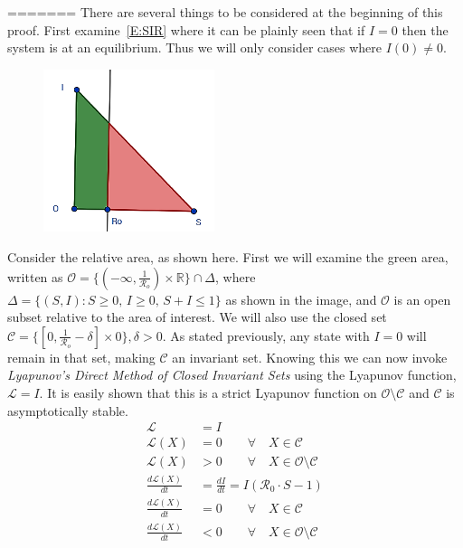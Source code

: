 \documentclass[12pt]{article}
\begin{document}
\begin{enumerate}[(a)]
=======
There are several things to be considered at the beginning of this proof. First examine~\eqref{E:SIR} where it can be plainly seen that if $I=0$ then the system is at an equilibrium. Thus we will only consider cases where $I(0)\neq 0$.
\begin{center}
\begin{figure}[h]
\includegraphics[width=5cm]{images/4MB3_A1_2c.png}
\end{figure}
\end{center}
Consider the relative area, as shown here. First we will examine the green area, written as ${\mathcal O}=\{(-\infty,\frac{1}{{\mathcal R}_o}) \times \mathbb{R}\}\cap \Delta$, where $\Delta=\{(S,I):S\ge0,\, I\ge0,\, S+I\le1\}$ as shown in the image, and ${\mathcal O}$ is an open subset relative to the area of interest. We will also use the closed set ${\mathcal C}=\{[0,\frac{1}{{\mathcal R}_o}-\delta]\times{0}\}, \delta > 0$. As stated previously, any state with $I=0$ will remain in that set, making $\mathcal C$ an invariant set. Knowing this we can now invoke \textit{Lyapunov's Direct Method of Closed Invariant Sets} using the Lyapunov function, $\mathcal{L} = I$. It is easily shown that this is a strict Lyapunov function on $\mathcal{O} \setminus \mathcal{C}$ and $\mathcal{C}$ is asymptotically stable.
\begin{equation}
{\displaystyle {\begin{aligned}
\mathcal{L}&=I \\
\mathcal{L}(X)&=0 \qquad \forall \quad X \in \mathcal{C} \\
\mathcal{L}(X) &> 0 \qquad \forall \quad X \in \mathcal{O} \setminus \mathcal{C} \\
\frac{d\mathcal{L}(X)}{dt} &= \frac{dI}{dt}=I(\mathcal{R}_0 \cdot S-1) \\
\frac{d\mathcal{L}(X)}{dt} &= 0 \qquad \forall \quad X \in \mathcal{C} \\
\frac{d\mathcal{L}(X)}{dt} &< 0 \qquad \forall \quad X \in \mathcal{O} \setminus \mathcal{C}
\end{aligned}}}

\end{equation}
\end{enumerate}
\end{document}

